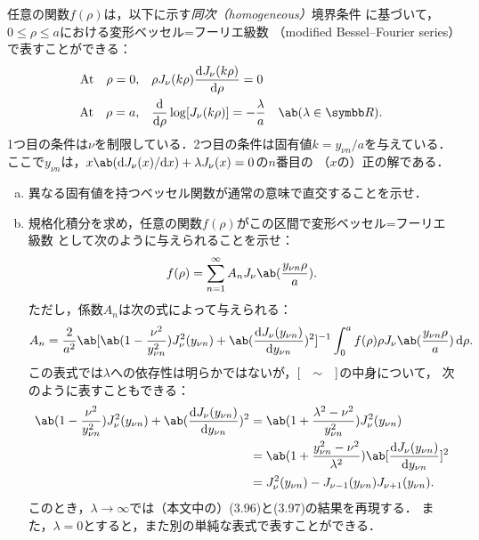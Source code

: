 \begin{bx1}
  任意の関数$f(\rho)$は，以下に示す\emph{同次（homogeneous）}境界条件
  に基づいて，$0 \leq \rho \leq a$における変形ベッセル=フーリエ級数
  （modified Bessel--Fourier series）で表すことができる：
  \begin{align}%
    \text{At} \qq \rho = 0, &\qq \rho J_{\nu}(k\rho) \diff{J_\nu(k\rho)}{\rho} = 0\\
    \text{At} \qq \rho = a, &\qq \diff**{\rho}{\log[J_\nu(k\rho)]} = -\frac{\lambda}{a} \qq \ab(\lambda \in \R).
  \end{align}%
  1つ目の条件は$\nu$を制限している．2つ目の条件は固有値$k = y_{\nu n}/a$を与えている．
  ここで$y_{\nu n}$は，$x \ab(\difs{J_\nu(x)}{x}) + \lambda J_\nu(x) = 0$の$n$番目の
  （$x$の）正の解である．
  \begin{enumerate}[(a)]%
    \item
      異なる固有値を持つベッセル関数が通常の意味で直交することを示せ．
    \item
      規格化積分を求め，任意の関数$f(\rho)$がこの区間で変形ベッセル=フーリエ級数
      として次のように与えられることを示せ：
      \begin{gather}%
        f(\rho) = \sum_{n=1}^\infty A_n J_\nu\ab(\frac{y_{\nu n} \rho}{a}).
      \end{gather}%
      ただし，係数$A_n$は次の式によって与えられる：
      \begin{gather}%
        A_n = \frac{2}{a^2}\ab[
          \ab(1-\frac{\nu^2}{y_{\nu n}^2})J_\nu^2(y_{\nu n}) + \ab(
          \diff{J_\nu(y_{\nu n})}{y_{\nu n}}
          )^2
        ]^{-1}
        \int_0^a f(\rho) \rho J_\nu\ab(\frac{y_{\nu n}\rho}{a})\dl{\rho}.
      \end{gather}%
      この表式では$\lambda$への依存性は明らかではないが，$[\hspace{1em}\sim\hspace{1em}]$の中身について，
      次のように表すこともできる：
      \begin{align}%
        \ab(1-\frac{\nu^2}{y_{\nu n}^2})J_\nu^2(y_{\nu n}) + \ab(
        \diff{J_\nu(y_{\nu n})}{y_{\nu n}}
        )^2
        & = 
        \ab(1+\frac{\lambda^2 - \nu^2}{y_{\nu n}^2}) J_\nu^2(y_{\nu n})\\
        &= \ab(1 + \frac{y_{\nu n}^2 - \nu^2}{\lambda^2}) \ab[\diff{J_\nu(y_{\nu n})}{y_{\nu n}}]^2\\
        &= J_\nu^2(y_{\nu n}) - J_{\nu - 1}(y_{\nu n}) J_{\nu+1}(y_{\nu n}).
      \end{align}%
      このとき，$\lambda\to\infty$では（本文中の）(3.96)と(3.97)の結果を再現する．
      また，$\lambda = 0$とすると，また別の単純な表式で表すことができる．
  \end{enumerate}%
\end{bx1}


\clearpage
